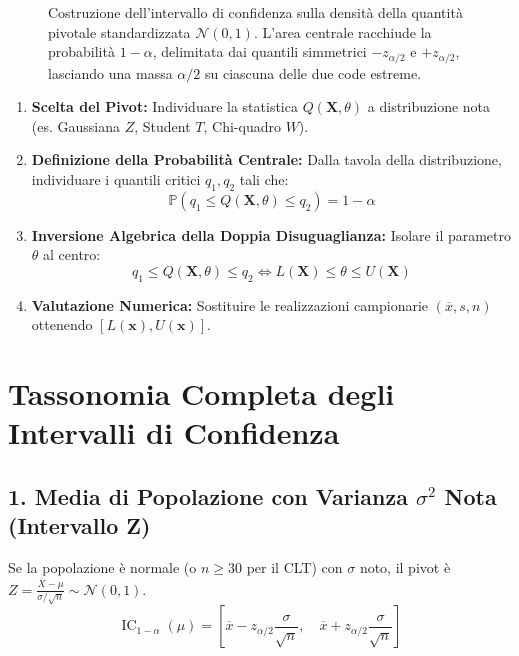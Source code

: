 \begin{figure}[htbp]
    \centering
    
    \caption{Costruzione dell'intervallo di confidenza sulla densità della quantità pivotale standardizzata $\mathcal{N}(0,1)$. L'area centrale racchiude la probabilità $1-\alpha$, delimitata dai quantili simmetrici $-z_{\alpha/2}$ e $+z_{\alpha/2}$, lasciando una massa $\alpha/2$ su ciascuna delle due code estreme.}
    \label{fig:ic_pivot}
\end{figure}

\begin{metodo}
\begin{enumerate}
    \item \textbf{Scelta del Pivot:} Individuare la statistica $Q(\mathbf{X}, \theta)$ a distribuzione nota (es. Gaussiana $Z$, Student $T$, Chi-quadro $W$).
    \item \textbf{Definizione della Probabilità Centrale:} Dalla tavola della distribuzione, individuare i quantili critici $q_1, q_2$ tali che:
    \begin{equation}
        \mathbb{P}(q_1 \le Q(\mathbf{X}, \theta) \le q_2) = 1 - \alpha
    \end{equation}
    \item \textbf{Inversione Algebrica della Doppia Disuguaglianza:} Isolare il parametro $\theta$ al centro:
    \begin{equation}
        q_1 \le Q(\mathbf{X}, \theta) \le q_2 \iff L(\mathbf{X}) \le \theta \le U(\mathbf{X})
    \end{equation}
    \item \textbf{Valutazione Numerica:} Sostituire le realizzazioni campionarie $(\overline{x}, s, n)$ ottenendo $[L(\mathbf{x}), U(\mathbf{x})]$.
\end{enumerate}
\end{metodo}

\section{Tassonomia Completa degli Intervalli di Confidenza}
\label{sec:tassonomia_ic}

\subsection{1. Media di Popolazione con Varianza $\sigma^2$ Nota (Intervallo Z)}
Se la popolazione è normale (o $n \ge 30$ per il CLT) con $\sigma$ noto, il pivot è $Z = \frac{\overline{X} - \mu}{\sigma / \sqrt{n}} \sim \mathcal{N}(0, 1)$.
\begin{equation}
    \operatorname{IC}_{1-\alpha}(\mu) = \left[ \overline{x} - z_{\alpha/2}\frac{\sigma}{\sqrt{n}}, \quad \overline{x} + z_{\alpha/2}\frac{\sigma}{\sqrt{n}} \right]
\end{equation}
